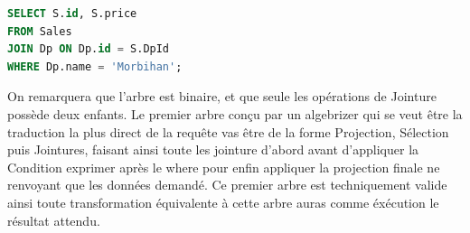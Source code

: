 \documentclass[12pt,a4paper]{article}
\begin{document}
\begin{minipage}{0.48\textwidth}
    \begin{lstlisting}[language=SQL]
SELECT S.id, S.price
FROM Sales
JOIN Dp ON Dp.id = S.DpId
WHERE Dp.name = 'Morbihan';
            \end{lstlisting}
    \label{fig:code:one}
\end{minipage}
\vspace{0.5em}
\begin{minipage}{0.48\textwidth}
    \centering
    \label{fig:arbre:one}
\end{minipage}
On remarquera que l'arbre est binaire, et que seule les opérations de Jointure possède deux enfants.
Le premier arbre conçu par un algebrizer qui se veut être la traduction la plus direct de la requête vas être de la forme Projection, Sélection puis Jointures, faisant ainsi toute les jointure d'abord avant d'appliquer la Condition exprimer après le where pour enfin appliquer la projection finale ne renvoyant que les données demandé. Ce premier arbre est techniquement valide ainsi toute transformation équivalente à cette arbre auras comme éxécution le résultat attendu.
\end{document}

